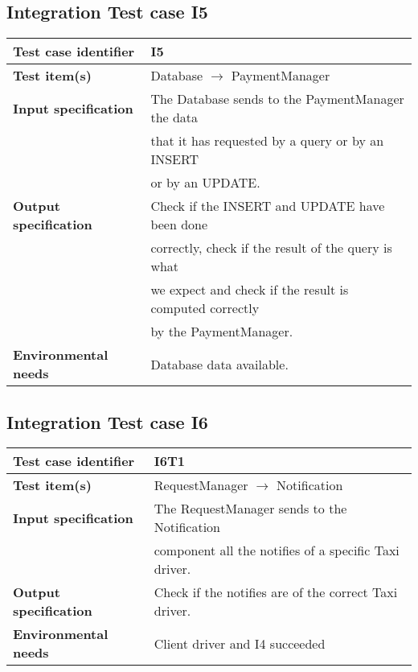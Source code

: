 	\subsection{Integration Test case I5}
		\begin{tabular}{ l l}
			\hline 		\textbf{Test case identifier} & I5 \\
			\hline		\textbf{Test item(s)}  & Database $\rightarrow$ PaymentManager \\
			\hline		\textbf{Input specification} & The Database sends to the PaymentManager the data\\ & that it has requested by a query or by an INSERT \\ & or by an UPDATE.\\
			\hline		\textbf{Output specification} &  Check if the INSERT and UPDATE have been done\\ & correctly, check if the result of the query is what\\ &  we expect and check if the result is computed correctly\\ & by the PaymentManager.\\
			\hline		\textbf{Environmental needs} & Database data available.\\
			\hline
		\end{tabular}
	\subsection{Integration Test case I6}
		\begin{tabular}{ l l}
			\hline 		\textbf{Test case identifier} & I6T1 \\
			\hline		\textbf{Test item(s)}  & RequestManager $\rightarrow$ Notification \\
			\hline		\textbf{Input specification} & The RequestManager sends to the Notification \\ & component all the notifies of a specific Taxi driver.\\
			\hline		\textbf{Output specification} & Check if the notifies are of the correct Taxi driver.\\
			\hline		\textbf{Environmental needs} & Client driver and I4 succeeded\\
			\hline
		\end{tabular}
		
		\vspace{1cm}
		

